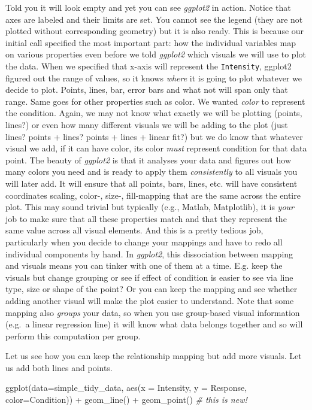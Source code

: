 \documentclass[
]{book}
\newenvironment{Shaded}{\begin{snugshade}}{\end{snugshade}}
\newcommand{\AttributeTok}[1]{\textcolor[rgb]{0.77,0.63,0.00}{#1}}
\newcommand{\CommentTok}[1]{\textcolor[rgb]{0.56,0.35,0.01}{\textit{#1}}}
\newcommand{\FunctionTok}[1]{\textcolor[rgb]{0.00,0.00,0.00}{#1}}
\newcommand{\NormalTok}[1]{#1}
\newcommand{\SpecialCharTok}[1]{\textcolor[rgb]{0.00,0.00,0.00}{#1}}
\begin{document}
Told you it will look empty and yet you can see \emph{ggplot2} in action. Notice that axes are labeled and their limits are set. You cannot see the legend (they are not plotted without corresponding geometry) but it is also ready. This is because our initial call specified the most important part: how the individual variables map on various properties even before we told \emph{ggplot2} which visuals we will use to plot the data. When we specified that x-axis will represent the \texttt{Intensity}, ggplot2 figured out the range of values, so it knows \emph{where} it is going to plot whatever we decide to plot. Points, lines, bar, error bars and what not will span only that range. Same goes for other properties such as color. We wanted \emph{color} to represent the condition. Again, we may not know what exactly we will be plotting (points, lines?) or even how many different visuals we will be adding to the plot (just lines? points + lines? points + lines + linear fit?) but we do know that whatever visual we add, if it can have color, its color \emph{must} represent condition for that data point. The beauty of \emph{ggplot2} is that it analyses your data and figures out how many colors you need and is ready to apply them \emph{consistently} to all visuals you will later add. It will ensure that all points, bars, lines, etc. will have consistent coordinates scaling, color-, size-, fill-mapping that are the same across the entire plot. This may sound trivial but typically (e.g., Matlab, Matplotlib), it is \emph{your} job to make sure that all these properties match and that they represent the same value across all visual elements. And this is a pretty tedious job, particularly when you decide to change your mappings and have to redo all individual components by hand. In \emph{ggplot2}, this dissociation between mapping and visuals means you can tinker with one of them at a time. E.g. keep the visuals but change grouping or see if effect of condition is easier to see via line type, size or shape of the point? Or you can keep the mapping and see whether adding another visual will make the plot easier to understand. Note that some mapping also \emph{groups} your data, so when you use group-based visual information (e.g.~a linear regression line) it will know what data belongs together and so will perform this computation per group.

Let us see how you can keep the relationship mapping but add more visuals. Let us add both lines and points.

\begin{Shaded}
\begin{Highlighting}[]
\FunctionTok{ggplot}\NormalTok{(}\AttributeTok{data=}\NormalTok{simple\_tidy\_data, }\FunctionTok{aes}\NormalTok{(}\AttributeTok{x =}\NormalTok{ Intensity, }\AttributeTok{y =}\NormalTok{ Response, }\AttributeTok{color=}\NormalTok{Condition)) }\SpecialCharTok{+} 
  \FunctionTok{geom\_line}\NormalTok{() }\SpecialCharTok{+}
  \FunctionTok{geom\_point}\NormalTok{() }\CommentTok{\# this is new!}
\end{Highlighting}
\end{Shaded}
\end{document}

